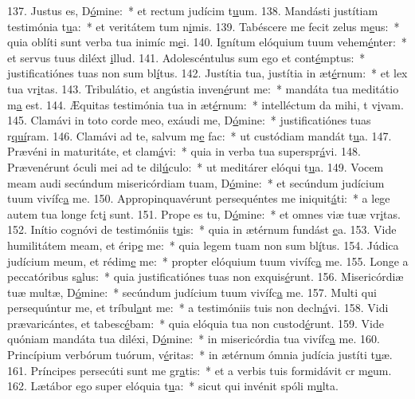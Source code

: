137. Justus es, D\uline{ó}mine:~* et rectum judícim t\uline{u}um.
138. Mandásti justítiam testimónia t\uline{u}a:~* et veritátem tum n\uline{i}mis.
139. Tabéscere me fecit zelus m\uline{e}us:~* quia oblíti sunt verba tua inimíc m\uline{e}i.
140. Ignítum elóquium tuum vehem\uline{é}nter:~* et servus tuus diléxt \uline{i}llud.
141. Adolescéntulus sum ego et cont\uline{é}mptus:~* justificatiónes tuas non sum bl\uline{í}tus.
142. Justítia tua, justítia in æt\uline{é}rnum:~* et lex tua vr\uline{i}tas.
143. Tribulátio, et angústia inven\uline{é}runt me:~* mandáta tua meditátio m\uline{a} est.
144. Æquitas testimónia tua in æt\uline{é}rnum:~* intelléctum da mihi, t v\uline{i}vam.
145. Clamávi in toto corde meo, exáudi me, D\uline{ó}mine:~* justificatiónes tuas r\uline{quí}ram.
146. Clamávi ad te, salvum m\uline{e} fac:~* ut custódiam mandát t\uline{u}a.
147. Prævéni in maturitáte, et clam\uline{á}vi:~* quia in verba tua superspr\uline{á}vi.
148. Prævenérunt óculi mei ad te dil\uline{ú}culo:~* ut meditárer elóqui t\uline{u}a.
149. Vocem meam audi secúndum misericórdiam tuam, D\uline{ó}mine:~* et secúndum judícium tuum vivífc\uline{a} me.
150. Appropinquavérunt persequéntes me iniquit\uline{á}ti:~* a lege autem tua longe fct\uline{i} sunt.
151. Prope es tu, D\uline{ó}mine:~* et omnes viæ tuæ vr\uline{i}tas.
152. Inítio cognóvi de testimóniis t\uline{u}is:~* quia in ætérnum fundást \uline{e}a.
153. Vide humilitátem meam, et érip\uline{e} me:~* quia legem tuam non sum bl\uline{í}tus.
154. Júdica judícium meum, et rédim\uline{e} me:~* propter elóquium tuum vivífc\uline{a} me.
155. Longe a peccatóribus s\uline{a}lus:~* quia justificatiónes tuas non exquis\uline{é}runt.
156. Misericórdiæ tuæ multæ, D\uline{ó}mine:~* secúndum judícium tuum vivífc\uline{a} me.
157. Multi qui persequúntur me, et tríbul\uline{a}nt me:~* a testimóniis tuis non decln\uline{á}vi.
158. Vidi prævaricántes, et tabesc\uline{é}bam:~* quia elóquia tua non custod\uline{é}runt.
159. Vide quóniam mandáta tua diléxi, D\uline{ó}mine:~* in misericórdia tua vivífc\uline{a} me.
160. Princípium verbórum tuórum, v\uline{é}ritas:~* in ætérnum ómnia judícia justíti t\uline{u}æ.
161. Príncipes persecúti sunt me gr\uline{a}tis:~* et a verbis tuis formidávit cr m\uline{e}um.
162. Lætábor ego super elóquia t\uline{u}a:~* sicut qui invénit spóli m\uline{u}lta.
